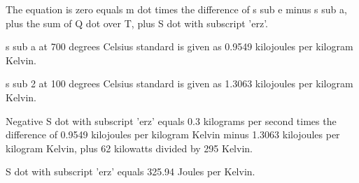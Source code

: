 The equation is zero equals m dot times the difference of s sub e minus s sub a, plus the sum of Q dot over T, plus S dot with subscript 'erz'.

s sub a at 700 degrees Celsius standard is given as 0.9549 kilojoules per kilogram Kelvin.

s sub 2 at 100 degrees Celsius standard is given as 1.3063 kilojoules per kilogram Kelvin.

Negative S dot with subscript 'erz' equals 0.3 kilograms per second times the difference of 0.9549 kilojoules per kilogram Kelvin minus 1.3063 kilojoules per kilogram Kelvin, plus 62 kilowatts divided by 295 Kelvin.

S dot with subscript 'erz' equals 325.94 Joules per Kelvin.